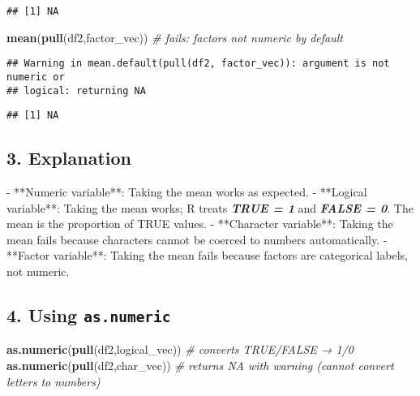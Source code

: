\documentclass[
]{article}
\newenvironment{Shaded}{\begin{snugshade}}{\end{snugshade}}
\newcommand{\CommentTok}[1]{\textcolor[rgb]{0.56,0.35,0.01}{\textit{#1}}}
\newcommand{\FunctionTok}[1]{\textcolor[rgb]{0.13,0.29,0.53}{\textbf{#1}}}
\newcommand{\InformationTok}[1]{\textcolor[rgb]{0.56,0.35,0.01}{\textbf{\textit{#1}}}}
\newcommand{\NormalTok}[1]{#1}
\newcommand{\SpecialStringTok}[1]{\textcolor[rgb]{0.31,0.60,0.02}{#1}}
\begin{document}
\begin{verbatim}
## [1] NA
\end{verbatim}

\begin{Shaded}
\begin{Highlighting}[]
\FunctionTok{mean}\NormalTok{(}\FunctionTok{pull}\NormalTok{(df2,factor\_vec))    }\CommentTok{\# fails: factors not numeric by default}
\end{Highlighting}
\end{Shaded}

\begin{verbatim}
## Warning in mean.default(pull(df2, factor_vec)): argument is not numeric or
## logical: returning NA
\end{verbatim}

\begin{verbatim}
## [1] NA
\end{verbatim}

\subsection{3. Explanation}\label{explanation}

\begin{Shaded}
\begin{Highlighting}[]
\SpecialStringTok{{-} }\NormalTok{**Numeric variable**: Taking the mean works as expected.  }
\SpecialStringTok{{-} }\NormalTok{**Logical variable**: Taking the mean works; R treats }\InformationTok{\textasciigrave{}TRUE = 1\textasciigrave{}}\NormalTok{ and }\InformationTok{\textasciigrave{}FALSE = 0\textasciigrave{}}\NormalTok{. The mean is the proportion of TRUE values.  }
\SpecialStringTok{{-} }\NormalTok{**Character variable**: Taking the mean fails because characters cannot be coerced to numbers automatically.  }
\SpecialStringTok{{-} }\NormalTok{**Factor variable**: Taking the mean fails because factors are categorical labels, not numeric.  }
\end{Highlighting}
\end{Shaded}

\subsection{\texorpdfstring{4. Using
\texttt{as.numeric}}{4. Using as.numeric}}\label{using-as.numeric}

\begin{Shaded}
\begin{Highlighting}[]
\FunctionTok{as.numeric}\NormalTok{(}\FunctionTok{pull}\NormalTok{(df2,logical\_vec))   }\CommentTok{\# converts TRUE/FALSE → 1/0}
\FunctionTok{as.numeric}\NormalTok{(}\FunctionTok{pull}\NormalTok{(df2,char\_vec))      }\CommentTok{\# returns NA with warning (cannot convert letters to numbers)}
\end{Highlighting}
\end{Shaded}
\end{document}
